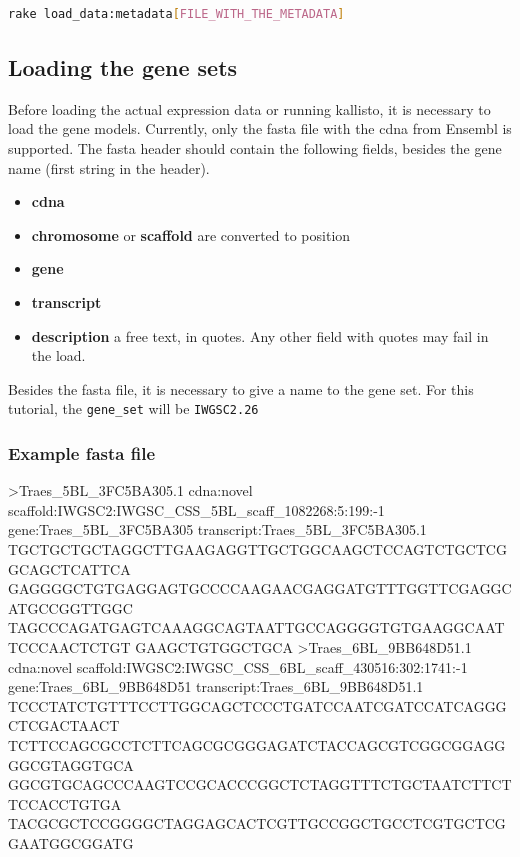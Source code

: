 \begin{lstlisting}[language=sh]
rake load_data:metadata[FILE_WITH_THE_METADATA]
\end{lstlisting}

\subsection{Loading the gene sets}\label{loading-the-gene-sets}

Before loading the actual expression data or running kallisto, it is
necessary to load the gene models. Currently, only the fasta file with
the cdna from Ensembl is supported. The fasta header should contain the
following fields, besides the gene name (first string in the header).

\begin{itemize}
\itemsep1pt\parskip0pt
\item
  \textbf{cdna}
\item
  \textbf{chromosome} or \textbf{scaffold} are converted to position
\item
  \textbf{gene}
\item
  \textbf{transcript}
\item
  \textbf{description} a free text, in quotes. Any other field with
  quotes may fail in the load.
\end{itemize}

Besides the fasta file, it is necessary to give a name to the gene set.
For this tutorial, the \lstinline!gene_set! will be
\lstinline!IWGSC2.26!

\subsubsection{Example fasta file}\label{example-fasta-file}

\begin{code}
>Traes_5BL_3FC5BA305.1 cdna:novel scaffold:IWGSC2:IWGSC_CSS_5BL_scaff_1082268:5:199:-1 gene:Traes_5BL_3FC5BA305 transcript:Traes_5BL_3FC5BA305.1
TGCTGCTGCTAGGCTTGAAGAGGTTGCTGGCAAGCTCCAGTCTGCTCGGCAGCTCATTCA
GAGGGGCTGTGAGGAGTGCCCCAAGAACGAGGATGTTTGGTTCGAGGCATGCCGGTTGGC
TAGCCCAGATGAGTCAAAGGCAGTAATTGCCAGGGGTGTGAAGGCAATTCCCAACTCTGT
GAAGCTGTGGCTGCA
>Traes_6BL_9BB648D51.1 cdna:novel scaffold:IWGSC2:IWGSC_CSS_6BL_scaff_430516:302:1741:-1 gene:Traes_6BL_9BB648D51 transcript:Traes_6BL_9BB648D51.1
TCCCTATCTGTTTCCTTGGCAGCTCCCTGATCCAATCGATCCATCAGGGCTCGACTAACT
TCTTCCAGCGCCTCTTCAGCGCGGGAGATCTACCAGCGTCGGCGGAGGGGCGTAGGTGCA
GGCGTGCAGCCCAAGTCCGCACCCGGCTCTAGGTTTCTGCTAATCTTCTTCCACCTGTGA
TACGCGCTCCGGGGCTAGGAGCACTCGTTGCCGGCTGCCTCGTGCTCGGAATGGCGGATG
\end{code}

